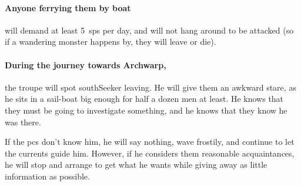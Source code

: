 \paragraph{Anyone ferrying them by boat}
will demand at least 5~\glspl{sp} per day, and will not hang around to be attacked (so if a wandering monster happens by, they will leave or die).

\paragraph{During the journey towards Archwarp,}
the troupe will spot \gls{southSeeker} leaving.
He will give them an awkward stare, as he sits in a sail-boat big enough for half a dozen men at least.
He knows that they must be going to investigate something, and he knows that they know he was there.

If the \glspl{pc} don't know him, he will say nothing, wave frostily, and continue to let the currents guide him.
However, if he considers them reasonable acquaintances, he will stop and arrange to get what he wants while giving away as little information as possible.

\southSeeker

